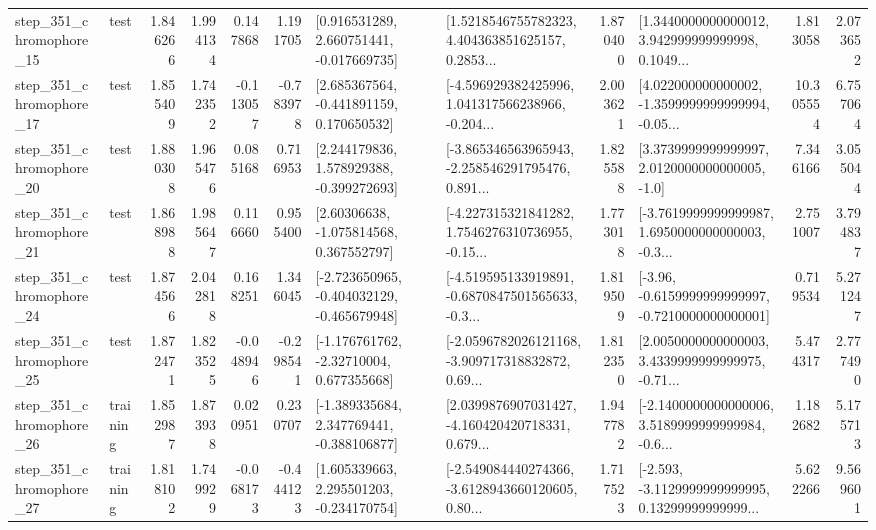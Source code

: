 \begin{tabular}{llrrrrllrlrr}
  step\_351\_chromophore\_15 &      test &      1.846266 &    1.994134 &      0.147868 &  1.191705 &    [0.916531289, 2.660751441, -0.017669735] &  [1.5218546755782323, 4.404363851625157, 0.2853... &       1.870400 &  [1.3440000000000012, 3.942999999999998, 0.1049... &            1.813058 &          2.073652 \\
  step\_351\_chromophore\_17 &      test &      1.855409 &    1.742352 &     -0.113057 & -0.783978 &    [2.685367564, -0.441891159, 0.170650532] &  [-4.596929382425996, 1.041317566238966, -0.204... &       2.003621 &  [4.022000000000002, -1.3599999999999994, -0.05... &           10.305554 &          6.757064 \\
  step\_351\_chromophore\_20 &      test &      1.880308 &    1.965476 &      0.085168 &  0.716953 &    [2.244179836, 1.578929388, -0.399272693] &  [-3.865346563965943, -2.258546291795476, 0.891... &       1.825588 &     [3.3739999999999997, 2.0120000000000005, -1.0] &            7.346166 &          3.055044 \\
  step\_351\_chromophore\_21 &      test &      1.868988 &    1.985647 &      0.116660 &  0.955400 &     [2.60306638, -1.075814568, 0.367552797] &  [-4.227315321841282, 1.7546276310736955, -0.15... &       1.773018 &  [-3.7619999999999987, 1.6950000000000003, -0.3... &            2.751007 &          3.794837 \\
  step\_351\_chromophore\_24 &      test &      1.874566 &    2.042818 &      0.168251 &  1.346045 &  [-2.723650965, -0.404032129, -0.465679948] &  [-4.519595133919891, -0.6870847501565633, -0.3... &       1.819509 &  [-3.96, -0.6159999999999997, -0.7210000000000001] &            0.719534 &          5.271247 \\
  step\_351\_chromophore\_25 &      test &      1.872471 &    1.823525 &     -0.048946 & -0.298541 &    [-1.176761762, -2.32710004, 0.677355668] &  [-2.0596782026121168, -3.909717318832872, 0.69... &       1.812350 &  [2.0050000000000003, 3.4339999999999975, -0.71... &            5.474317 &          2.777490 \\
  step\_351\_chromophore\_26 &  training &      1.852987 &    1.873938 &      0.020951 &  0.230707 &   [-1.389335684, 2.347769441, -0.388106877] &  [2.0399876907031427, -4.160420420718331, 0.679... &       1.947782 &  [-2.1400000000000006, 3.5189999999999984, -0.6... &            1.182682 &          5.175713 \\
  step\_351\_chromophore\_27 &  training &      1.818102 &    1.749929 &     -0.068173 & -0.444123 &    [1.605339663, 2.295501203, -0.234170754] &  [-2.549084440274366, -3.6128943660120605, 0.80... &       1.717523 &  [-2.593, -3.1129999999999995, 0.13299999999999... &            5.622266 &          9.569601 \\

\end{tabular}
